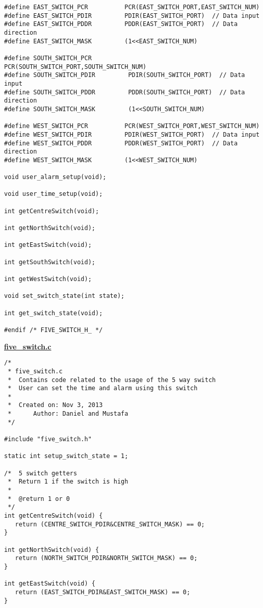 \documentclass{article}
\begin{document}
\begin{landscape}
\begin{lstlisting}[frame=single]
#define EAST_SWITCH_PCR          PCR(EAST_SWITCH_PORT,EAST_SWITCH_NUM)
#define EAST_SWITCH_PDIR         PDIR(EAST_SWITCH_PORT)  // Data input
#define EAST_SWITCH_PDDR         PDDR(EAST_SWITCH_PORT)  // Data direction
#define EAST_SWITCH_MASK         (1<<EAST_SWITCH_NUM)

#define SOUTH_SWITCH_PCR          PCR(SOUTH_SWITCH_PORT,SOUTH_SWITCH_NUM)
#define SOUTH_SWITCH_PDIR         PDIR(SOUTH_SWITCH_PORT)  // Data input
#define SOUTH_SWITCH_PDDR         PDDR(SOUTH_SWITCH_PORT)  // Data direction
#define SOUTH_SWITCH_MASK         (1<<SOUTH_SWITCH_NUM)

#define WEST_SWITCH_PCR          PCR(WEST_SWITCH_PORT,WEST_SWITCH_NUM)
#define WEST_SWITCH_PDIR         PDIR(WEST_SWITCH_PORT)  // Data input
#define WEST_SWITCH_PDDR         PDDR(WEST_SWITCH_PORT)  // Data direction
#define WEST_SWITCH_MASK         (1<<WEST_SWITCH_NUM)

void user_alarm_setup(void);

void user_time_setup(void);

int getCentreSwitch(void);

int getNorthSwitch(void);

int getEastSwitch(void);

int getSouthSwitch(void);

int getWestSwitch(void);

void set_switch_state(int state);

int get_switch_state(void);

#endif /* FIVE_SWITCH_H_ */
\end{lstlisting}

\bf{\underline{five\_switch.c}}
\begin{lstlisting}[frame=single]
/*
 * five_switch.c
 * 	Contains code related to the usage of the 5 way switch
 * 	User can set the time and alarm using this switch
 *
 *  Created on: Nov 3, 2013
 *      Author: Daniel and Mustafa
 */

#include "five_switch.h"

static int setup_switch_state = 1;

/*	5 switch getters
 * 	Return 1 if the switch is high
 * 	
 * 	@return 1 or 0
 */
int getCentreSwitch(void) {
   return (CENTRE_SWITCH_PDIR&CENTRE_SWITCH_MASK) == 0;
}

int getNorthSwitch(void) {
   return (NORTH_SWITCH_PDIR&NORTH_SWITCH_MASK) == 0;
}

int getEastSwitch(void) {
   return (EAST_SWITCH_PDIR&EAST_SWITCH_MASK) == 0;
}


\end{lstlisting}
\end{landscape}
\end{document}
